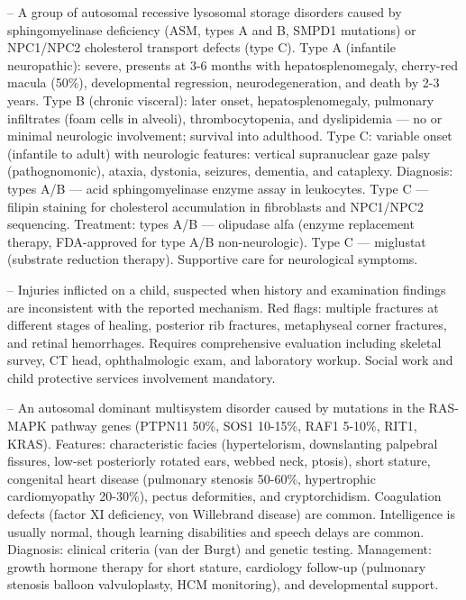 -- A group of autosomal recessive lysosomal storage disorders caused by sphingomyelinase deficiency (ASM, types A and B, SMPD1 mutations) or NPC1/NPC2 cholesterol transport defects (type C). Type A (infantile neuropathic): severe, presents at 3-6 months with hepatosplenomegaly, cherry-red macula (50\%), developmental regression, neurodegeneration, and death by 2-3 years. Type B (chronic visceral): later onset, hepatosplenomegaly, pulmonary infiltrates (foam cells in alveoli), thrombocytopenia, and dyslipidemia — no or minimal neurologic involvement; survival into adulthood. Type C: variable onset (infantile to adult) with neurologic features: vertical supranuclear gaze palsy (pathognomonic), ataxia, dystonia, seizures, dementia, and cataplexy. Diagnosis: types A/B — acid sphingomyelinase enzyme assay in leukocytes. Type C — filipin staining for cholesterol accumulation in fibroblasts and NPC1/NPC2 sequencing. Treatment: types A/B — olipudase alfa (enzyme replacement therapy, FDA-approved for type A/B non-neurologic). Type C — miglustat (substrate reduction therapy). Supportive care for neurological symptoms.

-- Injuries inflicted on a child, suspected when history and examination findings are inconsistent with the reported mechanism. Red flags: multiple fractures at different stages of healing, posterior rib fractures, metaphyseal corner fractures, and retinal hemorrhages. Requires comprehensive evaluation including skeletal survey, CT head, ophthalmologic exam, and laboratory workup. Social work and child protective services involvement mandatory.

-- An autosomal dominant multisystem disorder caused by mutations in the RAS-MAPK pathway genes (PTPN11 50\%, SOS1 10-15\%, RAF1 5-10\%, RIT1, KRAS). Features: characteristic facies (hypertelorism, downslanting palpebral fissures, low-set posteriorly rotated ears, webbed neck, ptosis), short stature, congenital heart disease (pulmonary stenosis 50-60\%, hypertrophic cardiomyopathy 20-30\%), pectus deformities, and cryptorchidism. Coagulation defects (factor XI deficiency, von Willebrand disease) are common. Intelligence is usually normal, though learning disabilities and speech delays are common. Diagnosis: clinical criteria (van der Burgt) and genetic testing. Management: growth hormone therapy for short stature, cardiology follow-up (pulmonary stenosis balloon valvuloplasty, HCM monitoring), and developmental support.

